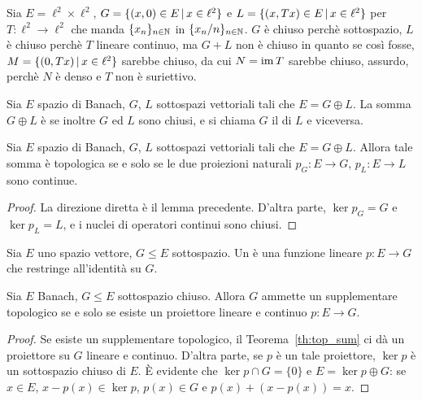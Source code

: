 \begin{counterexample}
	Sia $E= \ell^2 \times \ell^2$, $G = \{(x,0) \in E \,|\, x \in \ell^2\}$ e $L=\{(x,Tx) \in E \,|\, x \in \ell^2\}$ per $T: \ell^2 \to \ell^2$ che manda $\{x_n\}_{n \in \mathbb{N}}$ in $\{x_n/n\}_{n \in \mathbb{N}}$. $G$ è chiuso perchè sottospazio, $L$ è chiuso perchè $T$ lineare continuo, ma $G+L$ non è chiuso in quanto se così fosse, $M=\{(0, Tx) \,|\, x \in \ell^2\}$ sarebbe chiuso, da cui $N= \operatorname{im} T$ sarebbe chiuso, assurdo, perchè $N$ è denso e $T$ non è suriettivo.
\end{counterexample}

\begin{definition}
	Sia $E$ spazio di Banach, $G$, $L$ sottospazi vettoriali tali che $E=G \oplus L$. La somma $G \oplus L$ è  se inoltre $G$ ed $L$ sono chiusi, e si chiama $G$ il  di $L$ e viceversa.
\end{definition}

\begin{theorem}
\label{th:top_sum}
	Sia $E$ spazio di Banach, $G$, $L$ sottospazi vettoriali tali che $E=G \oplus L$.
	Allora tale somma è topologica se e solo se le due proiezioni naturali $p_G : E \to G$, $p_L : E \to L$ sono continue.
\end{theorem}
\begin{proof}
	La direzione diretta è il lemma precedente. D'altra parte, $\ker p_G = G$ e $\ker p_L = L$, e i nuclei di operatori continui sono chiusi.
\end{proof}

\begin{definition}
\label{def:projector}
	Sia $E$ uno spazio vettore, $G \leq E$ sottospazio.
	Un  è una funzione lineare $p:E \to G$ che restringe all'identità su $G$.
\end{definition}

\begin{lemma}
	Sia $E$ Banach, $G \leq E$ sottospazio chiuso.
	Allora $G$ ammette un supplementare topologico se e solo se esiste un proiettore lineare e continuo $p:E \to G$.
\end{lemma}
\begin{proof}
	Se esiste un supplementare topologico, il Teorema~\ref{th:top_sum} ci dà un proiettore su $G$ lineare e continuo.
	D'altra parte, se $p$ è un tale proiettore, $\ker p$ è un sottospazio chiuso di $E$. È evidente che $\ker p \cap G = \{0\}$ e $E = \ker p \oplus G$: se $x \in E$, $x - p(x) \in \ker p$, $p(x) \in G$ e $p(x) +(x- p(x)) = x$.
\end{proof}

